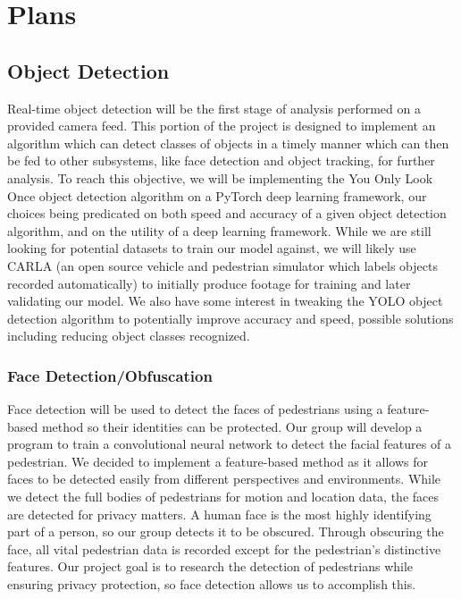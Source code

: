 \documentclass[onecolumn, draftclsnofoot,10pt, compsoc]{IEEEtran}
\begin{document}
\section{Plans}
\subsection{Object Detection}
Real-time object detection will be the first stage of analysis performed on a provided camera feed. This portion of the project is designed to implement an algorithm which can detect classes of objects in a timely manner which can then be fed to other subsystems, like face detection and object tracking, for further analysis. To reach this objective, we will be implementing the You Only Look Once object detection algorithm on a PyTorch deep learning framework, our choices being predicated on both speed and accuracy of a given object detection algorithm, and on the utility of a deep learning framework. While we are still looking for potential datasets to train our model against, we will likely use CARLA (an open source vehicle and pedestrian simulator which labels objects recorded automatically) to initially produce footage for training and later validating our model. We also have some interest in tweaking the YOLO object detection algorithm to potentially improve accuracy and speed, possible solutions including reducing object classes recognized.

\subsubsection{Face Detection/Obfuscation}
Face detection will be used to detect the faces of pedestrians using a feature-based method so their identities can be protected. Our group will develop a program to train a convolutional neural network to detect the facial features of a pedestrian. We decided to implement a feature-based method as it allows for faces to be detected easily from different perspectives and environments. While we detect the full bodies of pedestrians for motion and location data, the faces are detected for privacy matters. A human face is the most highly identifying part of a person, so our group detects it to be obscured. Through obscuring the face, all vital pedestrian data is recorded except for the pedestrian’s distinctive features. Our project goal is to research the detection of pedestrians while ensuring privacy protection, so face detection allows us to accomplish this.
\end{document}
